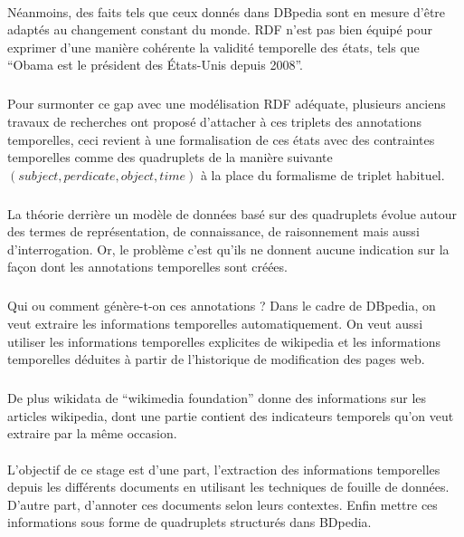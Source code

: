 \paragraph{}
Néanmoins, des faits tels que ceux donnés dans DBpedia sont en mesure d’être adaptés au changement constant du monde.
RDF n’est pas bien équipé pour exprimer d’une manière cohérente la validité temporelle des états, tels que “Obama est le président des États-Unis depuis 2008”. 
\subparagraph{}
Pour surmonter ce gap avec une modélisation RDF adéquate, plusieurs anciens travaux de recherches ont proposé d’attacher à ces triplets des annotations temporelles, ceci revient à une formalisation de ces états avec des contraintes temporelles comme des quadruplets de la manière suivante $(subject, perdicate, object, time)$ à la place du formalisme de triplet habituel.
\subparagraph{}
La théorie derrière un modèle de données basé sur des quadruplets évolue autour des termes de représentation, de connaissance, de raisonnement mais aussi d’interrogation. Or, le problème c’est qu’ils ne donnent aucune indication sur la façon dont les annotations temporelles sont créées.
\subparagraph{}
Qui ou comment génère-t-on ces annotations ?
\newline
Dans le cadre de DBpedia, on veut extraire les informations temporelles automatiquement. On veut aussi utiliser les informations temporelles explicites de wikipedia et les informations temporelles déduites à partir de l’historique de modiﬁcation des pages web.
\subparagraph{}
De plus wikidata de “wikimedia foundation” donne des informations sur les articles wikipedia, dont une partie contient des indicateurs temporels qu’on veut extraire par la même occasion.
\paragraph{}
L’objectif de ce stage est d’une part, l’extraction des informations temporelles depuis les diﬀérents documents en utilisant les techniques de fouille de données. D’autre part, d’annoter ces documents selon leurs contextes. Enﬁn mettre ces informations sous forme de quadruplets structurés dans BDpedia.